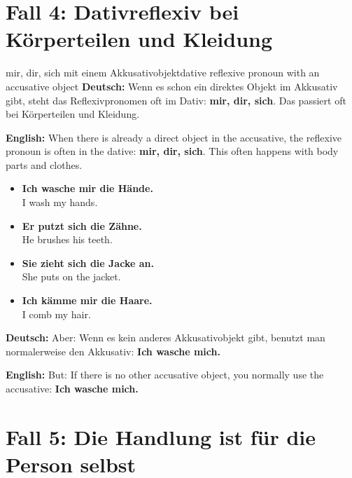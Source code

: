 \documentclass[a4paper,11pt]{article}
\newcommand{\GermanText}[1]{\textbf{Deutsch: }#1\par}
\newcommand{\EnglishText}[1]{{\small\color{SoftGray}\textbf{English: }#1\par}}
\newcommand{\ExampleItem}[2]{\item \textbf{#1}\\{\small\color{SoftGray}#2}}
\begin{document}
    
    \section{Fall 4: Dativreflexiv bei Körperteilen und Kleidung}
        
        \begin{grammarentry}{mir, dir, sich mit einem Akkusativobjekt}{dative reflexive pronoun with an accusative object}
            \GermanText{Wenn es schon ein direktes Objekt im Akkusativ gibt, steht das Reflexivpronomen oft im Dativ: \textbf{mir, dir, sich}. Das passiert oft bei Körperteilen und Kleidung.}
            \EnglishText{When there is already a direct object in the accusative, the reflexive pronoun is often in the dative: \textbf{mir, dir, sich}. This often happens with body parts and clothes.}
            
            \begin{exbox}
                \begin{itemize}
                    \ExampleItem{Ich wasche mir die Hände.}{I wash my hands.}
                    \ExampleItem{Er putzt sich die Zähne.}{He brushes his teeth.}
                    \ExampleItem{Sie zieht sich die Jacke an.}{She puts on the jacket.}
                    \ExampleItem{Ich kämme mir die Haare.}{I comb my hair.}
                \end{itemize}
            \end{exbox}
            
            \GermanText{Aber: Wenn es kein anderes Akkusativobjekt gibt, benutzt man normalerweise den Akkusativ: \textbf{Ich wasche mich.}}
            \EnglishText{But: If there is no other accusative object, you normally use the accusative: \textbf{Ich wasche mich.}}
        \end{grammarentry}
    
    
    \section{Fall 5: Die Handlung ist für die Person selbst}
        
\end{document}
